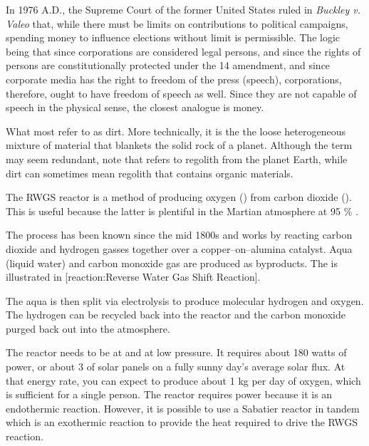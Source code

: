 In 1976 A.D., the Supreme Court of the former United States ruled in {\it Buckley v. Valeo} that, while there must be limits on contributions to political campaigns, spending money to influence elections without limit is permissible. The logic being that since corporations are considered legal persons, and since the rights of persons are constitutionally protected under the 14 amendment, and since corporate media has the right to freedom of the press (speech), corporations, therefore, ought to have freedom of speech as well. Since they are not capable of speech in the physical sense, the closest analogue is money.

What most refer to as dirt. More technically, it is the the loose heterogeneous mixture of material that blankets the solid rock of a planet. Although the term may seem redundant, note that  refers to regolith from the planet Earth, while dirt can sometimes mean regolith that contains organic materials.

The RWGS reactor is a method of producing oxygen () from carbon dioxide (). This is useful because the latter is plentiful in the Martian atmosphere at 95 \% .

\startformula
{}
\stopformula

The process has been known since the mid 1800s and works by reacting carbon dioxide and hydrogen gasses together over a copper--on--alumina catalyst. Aqua (liquid water) and carbon monoxide gas are produced as byproducts. The is illustrated in [reaction:Reverse Water Gas Shift Reaction].

The aqua is then split via electrolysis to produce molecular hydrogen and oxygen. The hydrogen can be recycled back into the reactor and the carbon monoxide purged back out into the atmosphere.

The reactor needs to be at  and at low pressure. It requires about 180 watts of power, or about 3  of solar panels on a fully sunny day's average solar flux. At that energy rate, you can expect to produce about 1 kg per day of oxygen, which is sufficient for a single person. The reactor requires power because it is an endothermic reaction. However, it is possible to use a Sabatier reactor in tandem which is an exothermic reaction to provide the heat required to drive the RWGS reaction.

